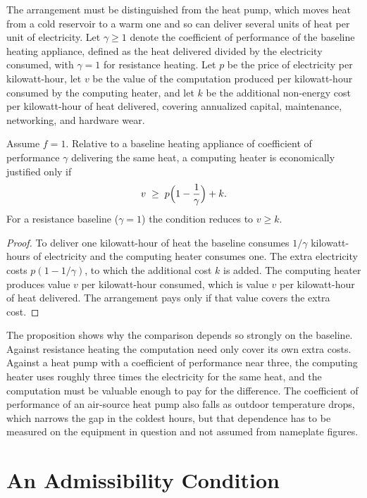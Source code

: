 The arrangement must be distinguished from the heat pump, which moves heat from a cold reservoir to a warm one and so can deliver several units of heat per unit of electricity. Let $\gamma\ge 1$ denote the coefficient of performance of the baseline heating appliance, defined as the heat delivered divided by the electricity consumed, with $\gamma=1$ for resistance heating. Let $p$ be the price of electricity per kilowatt-hour, let $v$ be the value of the computation produced per kilowatt-hour consumed by the computing heater, and let $k$ be the additional non-energy cost per kilowatt-hour of heat delivered, covering annualized capital, maintenance, networking, and hardware wear.

\begin{proposition}
\label{prop:heatpump}
Assume $f=1$. Relative to a baseline heating appliance of coefficient of performance $\gamma$ delivering the same heat, a computing heater is economically justified only if
\[
v\;\ge\;p\Bigl(1-\frac{1}{\gamma}\Bigr)+k .
\]
For a resistance baseline ($\gamma=1$) the condition reduces to $v\ge k$.
\end{proposition}

\begin{proof}
To deliver one kilowatt-hour of heat the baseline consumes $1/\gamma$ kilowatt-hours of electricity and the computing heater consumes one. The extra electricity costs $p(1-1/\gamma)$, to which the additional cost $k$ is added. The computing heater produces value $v$ per kilowatt-hour consumed, which is value $v$ per kilowatt-hour of heat delivered. The arrangement pays only if that value covers the extra cost.
\end{proof}

The proposition shows why the comparison depends so strongly on the baseline. Against resistance heating the computation need only cover its own extra costs. Against a heat pump with a coefficient of performance near three, the computing heater uses roughly three times the electricity for the same heat, and the computation must be valuable enough to pay for the difference. The coefficient of performance of an air-source heat pump also falls as outdoor temperature drops, which narrows the gap in the coldest hours, but that dependence has to be measured on the equipment in question and not assumed from nameplate figures.

\section{An Admissibility Condition}

